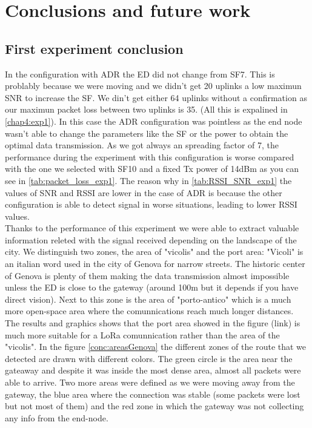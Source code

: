 \chapter{Conclusions and future work}
\label{chap:conclusions}
\ifpdf
    \graphicspath{{Conclusions/Figures/PNG/}{Conclusions/Figures/PDF/}{Conclusions/Figures/}}
\else
    \graphicspath{{Conclusions/Figures/EPS/}{Conclusions/Figures/}}
\fi

\section{First experiment conclusion}

In the configuration with ADR the ED did not change from SF7. This is problably because 
we were moving and we didn't get 20 uplinks a low maximun SNR to increase the SF. We din't 
get either 64 uplinks without a confirmation as our maximun packet loss between two uplinks 
is 35. (All this is expalined in \ref{chap4:exp1}). In this case the ADR configuration was 
pointless as the end node wasn't able to change the parameters like the SF or the power
to obtain the optimal data transmission. As we got always an spreading factor of 7, the performance 
during the experiment with this configuration is worse compared with the one we selected with SF10 
and a fixed Tx power of 14dBm as you can see in \ref{tab:packet_loss_exp1}. The reason why in 
\ref{tab:RSSI_SNR_exp1}
the values of SNR and RSSI are lower in the case of ADR is because the other configuration 
is able to detect
signal in worse situations, leading to lower RSSI values. \\
Thanks to the performance of this experiment we were able to extract 
valuable information releted with the signal received depending on the landscape of the city. 
We distinguish two zones, the area of "vicolis" and the port area:
"Vicoli" is an italian word used in the city of Genova for narrow streets. The historic center of Genova 
is plenty of them making the data transmission almost impossible unless the ED
is close to the gateway (around 100m but it depends if you have direct vision). Next to this zone is the 
area of "porto-antico" which is a much more open-space area where the comunnications reach much longer distances.
The results and graphics shows that the port area showed in the figure (link) is much more 
suitable for a LoRa comunnication rather than the area of the "vicolis".
In the figure \vref{conc:areasGenova} the different zones of the route that we detected are drawn with different colors. 
The green circle is the area near the gateaway and despite it was inside the most dense area, 
almost all packets were able to arrive. Two more areas were defined as we were moving away from the 
gateway, the blue area where the connection was stable (some packets were lost but not most of them) 
and the red zone in which the gateway was not collecting any info from the end-node.
